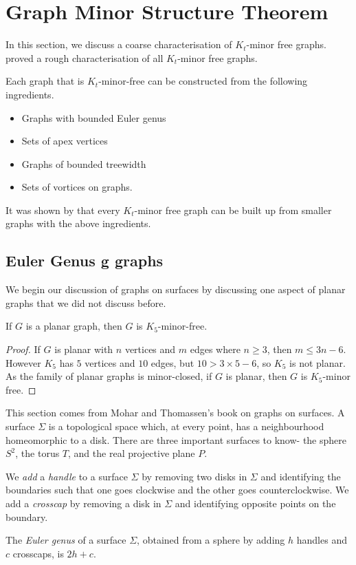 \section{Graph Minor Structure Theorem}\label{sec:Kt_Minor_Free}
In this section, we discuss a coarse characterisation of \(K_t\)-minor free graphs.\ \textcite{robertsonGraphMinorsXVII1999} proved a rough characterisation of all \(K_t\)-minor free graphs. 

Each graph that is $K_t$-minor-free can be constructed from the following ingredients.
\begin{itemize}
	\item Graphs with bounded Euler genus
	\item Sets of apex vertices
	\item Graphs of bounded treewidth
	\item Sets of vortices on graphs.
\end{itemize}
It was shown by \textcite{robertsonGraphMinorsXVII1999} that every \(K_t\)-minor free graph can be built up from smaller graphs with the above ingredients.
\subsection{Euler Genus g graphs}
We begin our discussion of graphs on surfaces by discussing one aspect of planar graphs that we did not discuss before. 
\begin{theorem}\label{thm:K5_Free_Planar}
	If \(G\) is a planar graph, then \(G\) is \(K_5\)-minor-free.
\end{theorem}
\begin{proof}
	If \(G\) is planar with \(n\) vertices and \(m\) edges where $n \geq 3$, then \(m \leq 3n -6\).
	However \(K_5\) has \(5\) vertices and \(10\) edges, but  \( 10 > 3 \times 5 - 6\), so \(K_5\) is not planar. As the family of planar graphs is minor-closed, if \(G\) is planar, then $G$ is \(K_5\)-minor free.
\end{proof}

This section comes from Mohar and Thomassen's\cite{moharGraphsSurfaces2001} book on graphs on surfaces. A surface \(\Sigma\) is a topological space which, at every point, has a neighbourhood homeomorphic to a disk. There are three important surfaces to know- the sphere \(S^2\), the torus \(T\), and the real projective plane \(P\).
\par
We \textit{add} a \textit{handle} to a surface \(\Sigma\) by removing two disks in \(\Sigma\) and identifying the boundaries such that one goes clockwise and the other goes counterclockwise. We add a \textit{crosscap} by removing a disk in \(\Sigma\) and identifying opposite points on the boundary. 
\par
\begin{definition}
	The \textit{Euler genus} of a surface \(\Sigma\), obtained from a sphere by adding \(h\) handles and \(c\) crosscaps, is \(2h + c\).
\end{definition}

